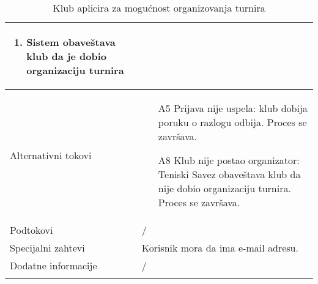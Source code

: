 \documentclass{article}
\begin{document}
\begin{longtable}{| p{} | p{} |}
\begin{enumerate}
        \item Sistem obaveštava klub da je dobio organizaciju turnira
    \end{enumerate}\\
\hline
    Alternativni tokovi & \begin{itemize}
        \item[A5] Prijava nije uspela: klub dobija poruku o razlogu odbija. Proces se završava.
        \item[A8] Klub nije postao organizator: Teniski Savez obaveštava klub da nije dobio organizaciju turnira. Proces se završava.
    \end{itemize}\\
\hline
    Podtokovi & /\\
\hline
    Specijalni zahtevi & Korisnik mora da ima e-mail adresu.\\
\hline
    Dodatne informacije & / \\
\hline 
\caption{Klub aplicira za mogućnost organizovanja turnira} 
\end{longtable}
\end{document}
